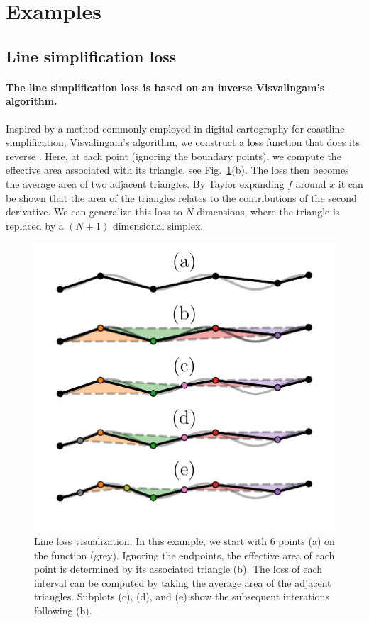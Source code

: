 \hypertarget{examples}{%
\section{Examples}\label{examples}}

\hypertarget{line-simplification-loss}{%
\subsection{Line simplification loss}\label{line-simplification-loss}}

\hypertarget{the-line-simplification-loss-is-based-on-an-inverse-visvalingams-algorithm.}{%
\paragraph{The line simplification loss is based on an inverse Visvalingam's algorithm.}\label{the-line-simplification-loss-is-based-on-an-inverse-visvalingams-algorithm.}}

Inspired by a method commonly employed in digital cartography for coastline simplification, Visvalingam's algorithm, we construct a loss function that does its reverse \cite{Visvalingam1990}.
Here, at each point (ignoring the boundary points), we compute the effective area associated with its triangle, see Fig.~\ref{fig:line_loss}(b).
The loss then becomes the average area of two adjacent triangles.
By Taylor expanding $f$ around $x$ it can be shown that the area of the triangles relates to the contributions of the second derivative.
We can generalize this loss to $N$ dimensions, where the triangle is replaced by a $(N+1)$ dimensional simplex.

\begin{figure}
\hypertarget{fig:line_loss}{%
\centering
\includegraphics{chapter_adaptive/figures/line_loss.pdf}
\caption{Line loss visualization.
In this example, we start with 6 points (a) on the function (grey).
Ignoring the endpoints, the effective area of each point is determined by its associated triangle (b).
The loss of each interval can be computed by taking the average area of the adjacent triangles.
Subplots (c), (d), and (e) show the subsequent interations following (b).}\label{fig:line_loss}
}
\end{figure}

